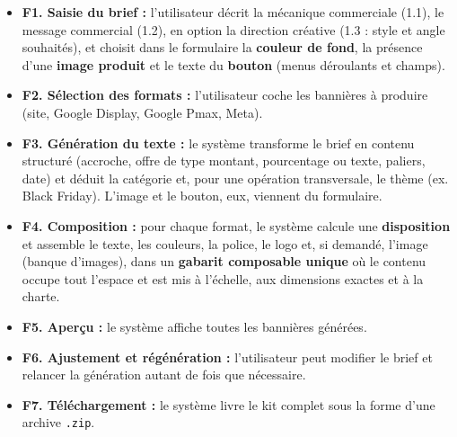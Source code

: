 \documentclass[11pt,a4paper]{article}
\begin{document}
\begin{itemize}[leftmargin=1.4em]
  \item \textbf{F1. Saisie du brief :} l'utilisateur décrit la mécanique
        commerciale (1.1), le message commercial (1.2), en option la direction
        créative (1.3 : style et angle souhaités), et choisit dans le formulaire la
        \textbf{couleur de fond}, la présence d'une \textbf{image produit} et le texte
        du \textbf{bouton} (menus déroulants et champs).
  \item \textbf{F2. Sélection des formats :} l'utilisateur coche les bannières
        à produire (site, Google Display, Google Pmax, Meta).
  \item \textbf{F3. Génération du texte :} le système transforme le brief en
        contenu structuré (accroche, offre de type montant, pourcentage ou texte,
        paliers, date) et déduit la catégorie et, pour une opération transversale, le
        thème (ex. Black Friday). L'image et le bouton, eux, viennent du formulaire.
  \item \textbf{F4. Composition :} pour chaque format, le système calcule une
        \textbf{disposition} et assemble le texte, les couleurs, la police, le logo et,
        si demandé, l'image (banque d'images), dans un \textbf{gabarit composable
        unique} où le contenu occupe tout l'espace et est mis à l'échelle, aux
        dimensions exactes et à la charte.
  \item \textbf{F5. Aperçu :} le système affiche toutes les bannières générées.
  \item \textbf{F6. Ajustement et régénération :} l'utilisateur peut modifier
        le brief et relancer la génération autant de fois que nécessaire.
  \item \textbf{F7. Téléchargement :} le système livre le kit complet sous la
        forme d'une archive \texttt{.zip}.
\end{itemize}

\end{document}
